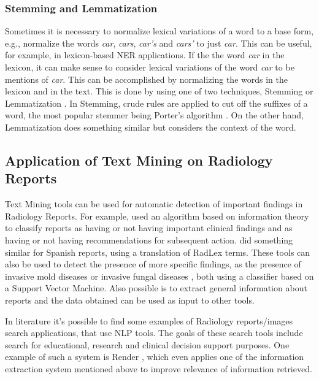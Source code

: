 \subsubsection{Stemming and Lemmatization}

Sometimes it is necessary to normalize lexical variations of a word to a base form, e.g., normalize the words \textit{car}, \textit{cars}, \textit{car’s} and \textit{cars’} to just \textit{car}. This can be useful, for example, in lexicon-based NER applications. If the the word \textit{car} in the lexicon, it can make sense to consider lexical variations of the word \textit{car} to be mentions of \textit{car}. This can be accomplished by normalizing the words in the lexicon and in the text. This is done by using one of two techniques, Stemming or Lemmatization \citep{Manning2009c}. In Stemming, crude rules are applied to cut off the suffixes of a word, the most popular stemmer being Porter’s algorithm \citep{Porter1980}. On the other hand, Lemmatization does something similar but considers the context of the word.  

\subsection{Application of Text Mining on Radiology Reports}

Text Mining tools can be used for automatic detection of important findings in Radiology Reports. For example, \citep{Dreyer2005} used an algorithm based on information theory to classify reports as having or not having important clinical findings and as having or not having recommendations for subsequent action. \citep{Cotik2015} did something similar for Spanish reports, using a translation of RadLex terms. These tools can also be used to detect the presence of more specific findings, as the presence of invasive mold diseases  \citep{Ananda-Rajah2014} or invasive fungal diseases \citep{Martinez2015}, both using a classifier based on a Support Vector Machine. Also possible is to extract general information about reports \citep{Hassanpour2016} and the data obtained can be used as input to other tools.

In literature it's possible to find some examples of Radiology reports/images search applications, that use NLP tools. The goals of these search tools include search for educational, research and clinical decision support purposes. One example of such a system is Render \citep{Dang2009}, which even applies one of the information extraction system mentioned above \citep{Dreyer2005} to improve relevance of information retrieved.

